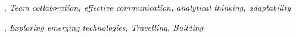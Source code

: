 , \textit{ Team collaboration, effective communication, analytical thinking, adaptability}
 
, \textit{ Exploring emerging technologies, Travelling, Building}


